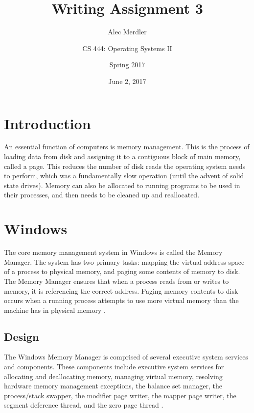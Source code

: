 \documentclass[letterpaper,draftclsnofoot,10pt,onecolumn,titlepage]{IEEEtran}\usepackage[margin=0.75in]{geometry}
\title{Writing Assignment 3}
\author{
	Alec Merdler\\
	\and
	CS 444: Operating Systems II\\
	\and
	Spring 2017\\
}
\date{June 2, 2017}
\begin{document}
\begin{titlepage}
\clearpage\maketitle
\thispagestyle{empty}

\maketitle
\end{titlepage}

\section{Introduction}
An essential function of computers is memory management. This is the process of loading data from disk and assigning
it to a contiguous block of main memory, called a page. This reduces the number of disk reads the operating system 
needs to perform, which was a fundamentally slow operation (until the advent of solid state drives). Memory can 
also be allocated to running programs to be used in their processes, and then needs to be cleaned up and 
reallocated.


\section{Windows}
The core memory management system in Windows is called the Memory Manager. The system has two primary tasks: mapping 
the virtual address space of a process to physical memory, and paging some contents of memory to disk. The Memory 
Manager ensures that when a process reads from or writes to memory, it is referencing the correct address. Paging 
memory contents to disk occurs when a running process attempts to use more virtual memory than the machine
has in physical memory \cite{windows}.

\subsection{Design}
The Windows Memory Manager is comprised of several executive system services and components. These components 
include executive system services for allocating and deallocating memory, managing virtual 
memory, resolving hardware memory management exceptions, the balance set manager, the process/stack swapper, 
the modifier page writer, the mapper page writer, the segment deference thread, and the zero page thread \cite{windows}.
\end{document}
